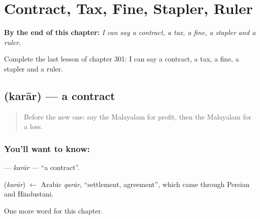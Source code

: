 
\chapter{Contract, Tax, Fine, Stapler, Ruler}
\label{ch:ml-contract-tax-fine-stapler-ruler}

\begin{chapteropening}
\textbf{By the end of this chapter:} \emph{I can say a contract, a tax, a fine, a stapler and a ruler.}

Complete the last lesson of chapter 301: I can say a contract, a tax, a fine, a stapler and a ruler.
\end{chapteropening}

\section[\texorpdfstring{\ml{കരാർ} (karār)}{കരാർ (karār)}]{ (karār) — a contract}

\label{lesson:ML-C301-karar}



\begin{quote}
Before the new one: say the Malayalam for profit, then the Malayalam for a loss.
\end{quote}

\subsection*{You'll want to know: }
\textbf{} — \emph{karār} — \textquotedblleft{}a contract\textquotedblright{}.

\begin{cousinweb}
\textbf{} (\emph{karār}) $\leftarrow$ Arabic \emph{qarār}, \textquotedblleft{}settlement, agreement\textquotedblright{}, which came through Persian and Hindustani.
\end{cousinweb}

\begin{grammarlens}[title={What you've built}]
One more word for this chapter.
\end{grammarlens}

